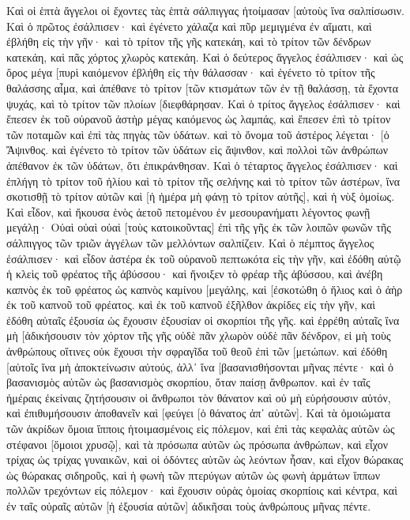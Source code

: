 Καὶ οἱ ἑπτὰ ἄγγελοι οἱ ἔχοντες τὰς ἑπτὰ σάλπιγγας ἡτοίμασαν [αὑτοὺς ἵνα σαλπίσωσιν. 
Καὶ ὁ πρῶτος ἐσάλπισεν· καὶ ἐγένετο χάλαζα καὶ πῦρ μεμιγμένα ἐν αἵματι, καὶ ἐβλήθη εἰς τὴν γῆν· καὶ τὸ τρίτον τῆς γῆς κατεκάη, καὶ τὸ τρίτον τῶν δένδρων κατεκάη, καὶ πᾶς χόρτος χλωρὸς κατεκάη. 
Καὶ ὁ δεύτερος ἄγγελος ἐσάλπισεν· καὶ ὡς ὄρος μέγα [πυρὶ καιόμενον ἐβλήθη εἰς τὴν θάλασσαν· καὶ ἐγένετο τὸ τρίτον τῆς θαλάσσης αἷμα, 
καὶ ἀπέθανε τὸ τρίτον [τῶν κτισμάτων τῶν ἐν τῇ θαλάσσῃ, τὰ ἔχοντα ψυχάς, καὶ τὸ τρίτον τῶν πλοίων [διεφθάρησαν. 
Καὶ ὁ τρίτος ἄγγελος ἐσάλπισεν· καὶ ἔπεσεν ἐκ τοῦ οὐρανοῦ ἀστὴρ μέγας καιόμενος ὡς λαμπάς, καὶ ἔπεσεν ἐπὶ τὸ τρίτον τῶν ποταμῶν καὶ ἐπὶ τὰς πηγὰς τῶν ὑδάτων. 
καὶ τὸ ὄνομα τοῦ ἀστέρος λέγεται· [ὁ Ἄψινθος. καὶ ἐγένετο τὸ τρίτον τῶν ὑδάτων εἰς ἄψινθον, καὶ πολλοὶ τῶν ἀνθρώπων ἀπέθανον ἐκ τῶν ὑδάτων, ὅτι ἐπικράνθησαν. 
Καὶ ὁ τέταρτος ἄγγελος ἐσάλπισεν· καὶ ἐπλήγη τὸ τρίτον τοῦ ἡλίου καὶ τὸ τρίτον τῆς σελήνης καὶ τὸ τρίτον τῶν ἀστέρων, ἵνα σκοτισθῇ τὸ τρίτον αὐτῶν καὶ [ἡ ἡμέρα μὴ φάνῃ τὸ τρίτον αὐτῆς], καὶ ἡ νὺξ ὁμοίως. 
Καὶ εἶδον, καὶ ἤκουσα ἑνὸς ἀετοῦ πετομένου ἐν μεσουρανήματι λέγοντος φωνῇ μεγάλῃ· Οὐαὶ οὐαὶ οὐαὶ [τοὺς κατοικοῦντας] ἐπὶ τῆς γῆς ἐκ τῶν λοιπῶν φωνῶν τῆς σάλπιγγος τῶν τριῶν ἀγγέλων τῶν μελλόντων σαλπίζειν. 
Καὶ ὁ πέμπτος ἄγγελος ἐσάλπισεν· καὶ εἶδον ἀστέρα ἐκ τοῦ οὐρανοῦ πεπτωκότα εἰς τὴν γῆν, καὶ ἐδόθη αὐτῷ ἡ κλεὶς τοῦ φρέατος τῆς ἀβύσσου· 
καὶ ἤνοιξεν τὸ φρέαρ τῆς ἀβύσσου, καὶ ἀνέβη καπνὸς ἐκ τοῦ φρέατος ὡς καπνὸς καμίνου [μεγάλης, καὶ [ἐσκοτώθη ὁ ἥλιος καὶ ὁ ἀὴρ ἐκ τοῦ καπνοῦ τοῦ φρέατος. 
καὶ ἐκ τοῦ καπνοῦ ἐξῆλθον ἀκρίδες εἰς τὴν γῆν, καὶ ἐδόθη αὐταῖς ἐξουσία ὡς ἔχουσιν ἐξουσίαν οἱ σκορπίοι τῆς γῆς. 
καὶ ἐρρέθη αὐταῖς ἵνα μὴ [ἀδικήσουσιν τὸν χόρτον τῆς γῆς οὐδὲ πᾶν χλωρὸν οὐδὲ πᾶν δένδρον, εἰ μὴ τοὺς ἀνθρώπους οἵτινες οὐκ ἔχουσι τὴν σφραγῖδα τοῦ θεοῦ ἐπὶ τῶν [μετώπων. 
καὶ ἐδόθη [αὐτοῖς ἵνα μὴ ἀποκτείνωσιν αὐτούς, ἀλλ᾽ ἵνα [βασανισθήσονται μῆνας πέντε· καὶ ὁ βασανισμὸς αὐτῶν ὡς βασανισμὸς σκορπίου, ὅταν παίσῃ ἄνθρωπον. 
καὶ ἐν ταῖς ἡμέραις ἐκείναις ζητήσουσιν οἱ ἄνθρωποι τὸν θάνατον καὶ οὐ μὴ εὑρήσουσιν αὐτόν, καὶ ἐπιθυμήσουσιν ἀποθανεῖν καὶ [φεύγει [ὁ θάνατος ἀπ᾽ αὐτῶν]. 
Καὶ τὰ ὁμοιώματα τῶν ἀκρίδων ὅμοια ἵπποις ἡτοιμασμένοις εἰς πόλεμον, καὶ ἐπὶ τὰς κεφαλὰς αὐτῶν ὡς στέφανοι [ὅμοιοι χρυσῷ], καὶ τὰ πρόσωπα αὐτῶν ὡς πρόσωπα ἀνθρώπων, 
καὶ εἶχον τρίχας ὡς τρίχας γυναικῶν, καὶ οἱ ὀδόντες αὐτῶν ὡς λεόντων ἦσαν, 
καὶ εἶχον θώρακας ὡς θώρακας σιδηροῦς, καὶ ἡ φωνὴ τῶν πτερύγων αὐτῶν ὡς φωνὴ ἁρμάτων ἵππων πολλῶν τρεχόντων εἰς πόλεμον· 
καὶ ἔχουσιν οὐρὰς ὁμοίας σκορπίοις καὶ κέντρα, καὶ ἐν ταῖς οὐραῖς αὐτῶν [ἡ ἐξουσία αὐτῶν] ἀδικῆσαι τοὺς ἀνθρώπους μῆνας πέντε. 
